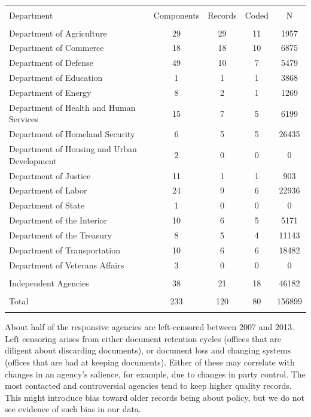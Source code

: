 \documentclass{article}
\begin{document}
\begin{table}[!htbp] \centering 
  \caption{} 
  \label{} 
\begin{tabular}{@{\extracolsep{5pt}} lcccc} 
\\[-1.8ex]\hline 
\hline \\[-1.8ex] 
Department & Components & Records & Coded & N \\ 
\hline \\[-1.8ex] 
Department of Agriculture & 29 & 29 & 11 & 1957 \\ 
Department of Commerce & 18 & 18 & 10 & 6875 \\ 
Department of Defense & 49 & 10 & 7 & 5479 \\ 
Department of Education & 1 & 1 & 1 & 3868 \\ 
Department of Energy & 8 & 2 & 1 & 1269 \\ 
Department of Health and Human Services & 15 & 7 & 5 & 6199 \\ 
Department of Homeland Security & 6 & 5 & 5 & 26435 \\ 
Department of Housing and Urban Development & 2 & 0 & 0 & 0 \\ 
Department of Justice & 11 & 1 & 1 & 903 \\ 
Department of Labor & 24 & 9 & 6 & 22936 \\ 
Department of State & 1 & 0 & 0 & 0 \\ 
Department of the Interior & 10 & 6 & 5 & 5171 \\ 
Department of the Treasury & 8 & 5 & 4 & 11143 \\ 
Department of Transportation & 10 & 6 & 6 & 18482 \\ 
Department of Veterans Affairs & 3 & 0 & 0 & 0 \\ 
\hline \\[-1.8ex] 
Independent Agencies & 38 & 21 & 18 & 46182 \\ 
\hline \\[-1.8ex] 
Total & 233 & 120 & 80 & 156899 \\ 
\hline \\[-1.8ex] 
\end{tabular} 
\end{table} 

About half of the responsive agencies are left-censored between 2007 and 2013. Left censoring arises from either document retention cycles (offices that are diligent about discarding documents), or document loss and changing systems (offices that are bad at keeping documents). Either of these may correlate with changes in an agency's salience, for example, due to changes in party control. 
The most contacted and controversial agencies tend to keep higher quality records. 
This might introduce bias toward older records being about policy, but we do not see evidence of such bias in our data. 
\end{document}
